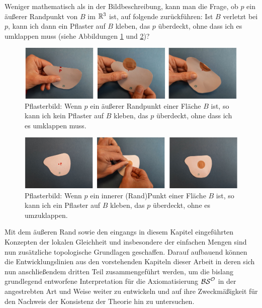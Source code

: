     Weniger
    mathematisch als in der Bildbeschreibung, kann man die Frage, ob $p$ ein äußerer Randpunkt von $B$ im $\mathbb{R}^3$ ist, auf folgende zurückführen:
    Ist $B$ verletzt bei $p$, kann ich dann ein Pflaster auf $B$ kleben, das $p$ überdeckt, ohne dass ich es umklappen muss (siehe Abbildungen \ref{fig:pflasterbild-aeusserer-rand} und \ref{fig:pflasterbild-innerer-pkt})?
    
    \begin{figure}[ht]
        \centering
        \includegraphics[width=\textwidth]{abb/pflasterbild-aeusserer-rand.png}
        \caption[Pflasterbild: äußerer Randpunkt]{Pflasterbild: Wenn $p$ ein äußerer Randpunkt einer Fläche $B$ ist, so kann ich kein Pflaster auf $B$ kleben, das $p$ überdeckt, ohne dass ich es umklappen muss.}
        \label{fig:pflasterbild-aeusserer-rand}
    \end{figure}
    
    \begin{figure}[ht]
        \centering
        \includegraphics[width=\textwidth]{abb/pflasterbild-innerer-pkt.png}
        \caption[Pflasterbild: innerer Punkt]{Pflasterbild: Wenn $p$ ein innerer (Rand)Punkt einer Fläche $B$ ist, so kann ich ein Pflaster auf $B$ kleben, das $p$ überdeckt, ohne es umzuklappen.}
        \label{fig:pflasterbild-innerer-pkt}
    \end{figure}
    

\bigskip \noindent
Mit dem äußeren Rand sowie den eingangs in diesem Kapitel eingeführten Konzepten der lokalen Gleichheit und insbesondere der einfachen Mengen sind nun zusätzliche topologische Grundlagen geschaffen. Darauf aufbauend können die Entwicklungslinien aus den vorstehenden Kapiteln dieser Arbeit in deren sich nun anschließendem dritten Teil zusammengeführt werden, um die bislang grundlegend entworfene Interpretation für die Axiomatisierung $\mathcal{BS}^{\mathcal{O}}$ in der angestrebten Art und Weise weiter zu entwickeln und auf ihre Zweckmäßigkeit für den Nachweis der Konsistenz der Theorie hin zu untersuchen.

